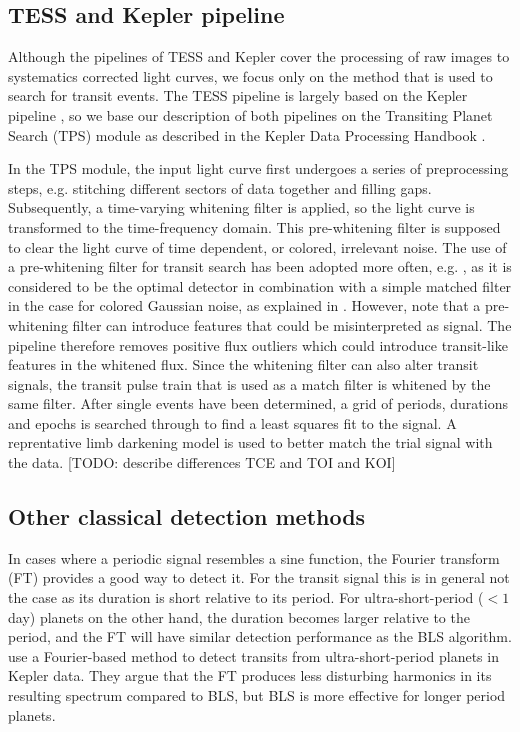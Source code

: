 \subsection{TESS and Kepler pipeline}
Although the pipelines of TESS and Kepler cover the processing of raw images to systematics corrected light curves, we focus only on the method that is used to search for transit events.  The TESS pipeline is largely based on the Kepler pipeline \citep{jenkins2016tess}, so we base our description of both pipelines on the Transiting Planet Search (TPS) module as described in the Kepler Data Processing Handbook \cite{jenkins2017kepler}. 

In the TPS module, the input light curve first undergoes a series of preprocessing steps, e.g. stitching different sectors of data together and filling gaps. Subsequently, a time-varying whitening filter is applied, so the light curve is transformed to the time-frequency domain. This pre-whitening filter is supposed to clear the light curve of time dependent, or colored, irrelevant noise. The use of a pre-whitening filter for transit search has been adopted more often, e.g. \cite{carpano2003detecting}, as it is considered to be the optimal detector in combination with a simple matched filter in the case for colored Gaussian noise, as explained in \cite{jenkins2002impact}. However, \cite{rodenbeck2018revisiting} note that a pre-whitening filter can introduce features that could be misinterpreted as signal. The pipeline therefore removes positive flux outliers which could introduce transit-like features in the whitened flux. Since the whitening filter can also alter transit signals, the transit pulse train that is used as a match filter is whitened by the same filter. After single events have been determined, a grid of periods, durations and epochs is searched through to find a least squares fit to the signal. A reprentative limb darkening model is used to better match the trial signal with the data.
[TODO: describe differences TCE and TOI and KOI]

\subsection{Other classical detection methods}
In cases where a periodic signal resembles a sine function, the Fourier transform (FT) provides a good way to detect it. For the transit signal this is in general not the case as its duration is short relative to its period. For ultra-short-period ($< 1$ day) planets on the other hand, the duration becomes larger relative to the period, and the FT will have similar detection performance as the BLS algorithm. \cite{sanchis2014study} use a Fourier-based method to detect transits from ultra-short-period planets in Kepler data.
They argue that the FT produces less disturbing harmonics in its resulting spectrum compared to BLS, but BLS is more effective for longer period planets. 
    
